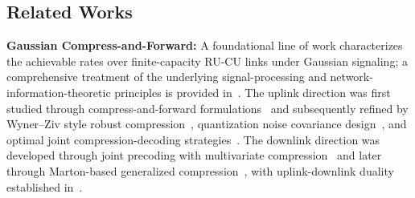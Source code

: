 \documentclass[10pt, twocolumn, comsoc]{IEEEtran}
\begin{document}

\subsection{Related Works}
\label{sec:related}

{\bf{Gaussian Compress-and-Forward:}}
A foundational line of work characterizes the achievable rates over finite-capacity RU-CU links under Gaussian signaling; a comprehensive treatment of the underlying signal-processing and network-information-theoretic principles is provided in~\cite{park2014fronthaul}.
The uplink direction was first studied through compress-and-forward formulations~\cite{sanderovich2009uplink} and subsequently refined by Wyner--Ziv style robust compression~\cite{park2013robust}, quantization noise covariance design~\cite{zhou2014optimized}, and optimal joint compression-decoding strategies~\cite{zhou2016optimal}. The downlink direction was developed through joint precoding with multivariate compression~\cite{park2013joint} and later through Marton-based generalized compression~\cite{patil2019generalized}, with uplink-downlink duality established in~\cite{liu2021duality}.
\end{document}
